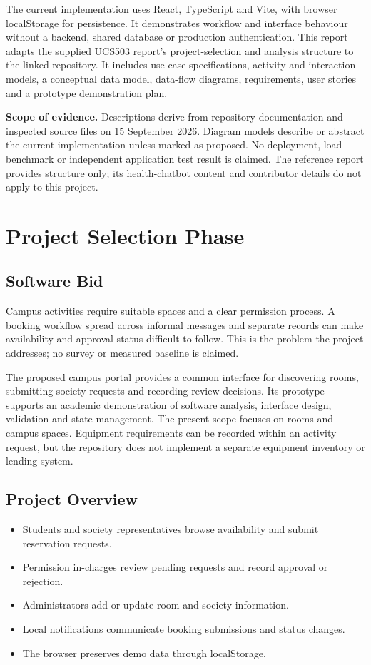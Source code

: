 \documentclass[11pt,a4paper]{report}
\begin{document}
The current implementation uses React, TypeScript and Vite, with browser localStorage for persistence. It demonstrates workflow and interface behaviour without a backend, shared database or production authentication. This report adapts the supplied UCS503 report's project-selection and analysis structure to the linked repository. It includes use-case specifications, activity and interaction models, a conceptual data model, data-flow diagrams, requirements, user stories and a prototype demonstration plan.

\textbf{Scope of evidence.} Descriptions derive from repository documentation and inspected source files on 15 September 2026. Diagram models describe or abstract the current implementation unless marked as proposed. No deployment, load benchmark or independent application test result is claimed. The reference report provides structure only; its health-chatbot content and contributor details do not apply to this project.
\clearpage{}
\chapter{Project Selection Phase}
\section{Software Bid}
Campus activities require suitable spaces and a clear permission process. A booking workflow spread across informal messages and separate records can make availability and approval status difficult to follow. This is the problem the project addresses; no survey or measured baseline is claimed.

The proposed campus portal provides a common interface for discovering rooms, submitting society requests and recording review decisions. Its prototype supports an academic demonstration of software analysis, interface design, validation and state management. The present scope focuses on rooms and campus spaces. Equipment requirements can be recorded within an activity request, but the repository does not implement a separate equipment inventory or lending system.
\section{Project Overview}
\begin{itemize}
\item Students and society representatives browse availability and submit reservation requests.
\item Permission in-charges review pending requests and record approval or rejection.
\item Administrators add or update room and society information.
\item Local notifications communicate booking submissions and status changes.
\item The browser preserves demo data through localStorage.
\end{itemize}
\end{document}
